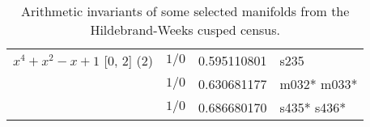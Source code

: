 \documentclass[a4paper]{amsart}
\newcommand{\PreserveBackslash}[1]{\let\temp =\\#1\let\\=\temp}
\theoremstyle{definition}
\begin{document}
\begin{table}[p]
\begin{tabular}{|>{\PreserveBackslash\raggedright}p{3.5cm} |l %
	|l %
	|>{\PreserveBackslash\raggedright}p{5cm}|}
\hbox{$x^4 + x^2 - x + 1$} [0, 2] (2) &
$1/0$ &
 0.595110801&
{s235} \\

\cline{2-4}

& %
$1/0$ &
 0.630681177&
{m032* m033*} \\

\cline{2-4}

& %
$1/0$ &
 0.686680170&
{s435* s436*} \\

\hline

\end{tabular}
\caption{Arithmetic invariants of some selected manifolds from the 
Hildebrand-Weeks cusped census.}
\label{cusped_ex}
\end{table}
\end{document}
